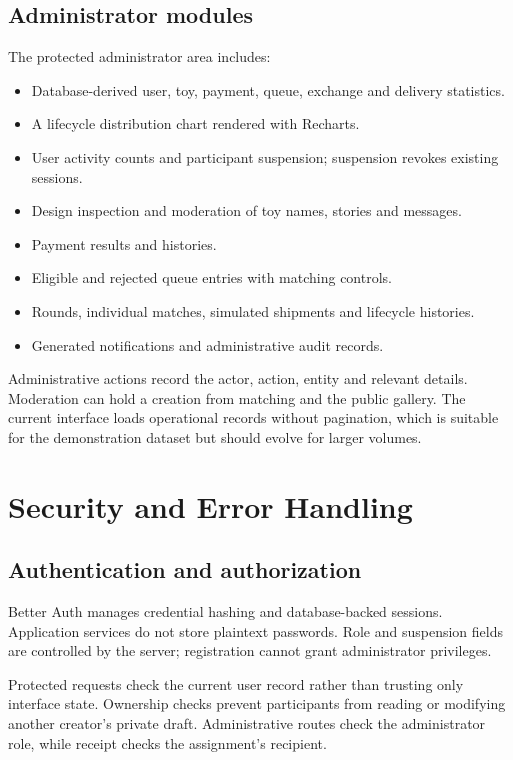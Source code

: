 \documentclass[11pt,a4paper]{article}
\begin{document}
\subsection{Administrator modules}
The protected administrator area includes:
\begin{itemize}
  \item Database-derived user, toy, payment, queue, exchange and delivery statistics.
  \item A lifecycle distribution chart rendered with Recharts.
  \item User activity counts and participant suspension; suspension revokes existing sessions.
  \item Design inspection and moderation of toy names, stories and messages.
  \item Payment results and histories.
  \item Eligible and rejected queue entries with matching controls.
  \item Rounds, individual matches, simulated shipments and lifecycle histories.
  \item Generated notifications and administrative audit records.
\end{itemize}

Administrative actions record the actor, action, entity and relevant details. Moderation can hold a creation from matching and the public gallery. The current interface loads operational records without pagination, which is suitable for the demonstration dataset but should evolve for larger volumes.

\section{Security and Error Handling}

\subsection{Authentication and authorization}
Better Auth manages credential hashing and database-backed sessions. Application services do not store plaintext passwords. Role and suspension fields are controlled by the server; registration cannot grant administrator privileges.

Protected requests check the current user record rather than trusting only interface state. Ownership checks prevent participants from reading or modifying another creator's private draft. Administrative routes check the administrator role, while receipt checks the assignment's recipient.
\end{document}
